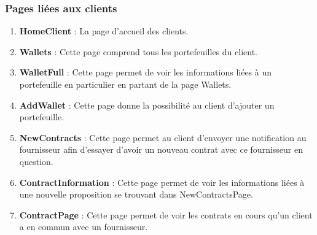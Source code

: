 \subsubsection{Pages liées aux clients}
\begin{enumerate}
\item \textbf{HomeClient} :\newline
La page d’accueil des clients.
\item \textbf{Wallets} :\newline
Cette page comprend tous les portefeuilles du client.
\item \textbf{WalletFull} :\newline
Cette page permet de voir les informations liées à un portefeuille en particulier en partant de la page Wallets.
\item \textbf{AddWallet} :\newline
Cette page donne la possibilité au client d’ajouter un portefeuille.
\item \textbf{NewContracts} : \newline
Cette page permet au client d’envoyer une notification au fournisseur afin d’essayer d’avoir un nouveau contrat avec ce fournisseur en question.
\item \textbf{ContractInformation} : \newline
Cette page permet de voir les informations liées à une nouvelle proposition se trouvant dans NewContractsPage.
\item \textbf{ContractPage} : \newline
Cette page permet de voir les contrats en cours qu’un client a en commun avec un fournisseur.
\end{enumerate} 

